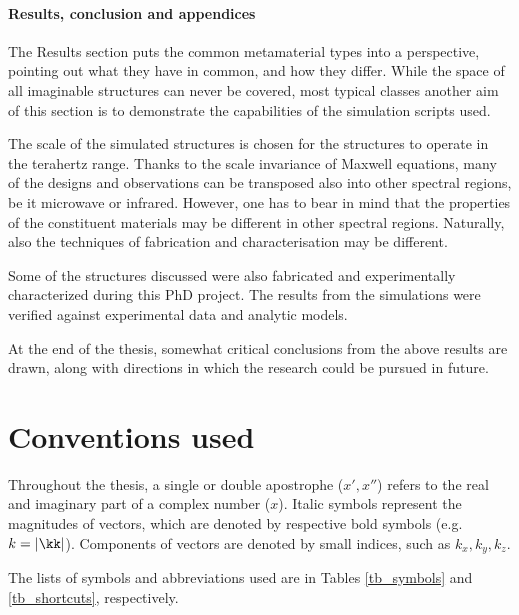\paragraph{Results, conclusion and appendices} %
The Results section puts the common metamaterial types into a perspective, pointing out what they have in common, and how they differ.  %
While the space of all imaginable structures can never be covered, most typical classes  another aim of this section is to demonstrate the capabilities of the simulation scripts used. 

The scale of the simulated structures is chosen for the structures to operate in the terahertz range. 
Thanks to the scale invariance of Maxwell equations, many of the designs and observations can be transposed also into other spectral regions, be it microwave or infrared. However, one has to bear in mind that the properties of the constituent materials may be different in other spectral regions. Naturally, also the techniques of fabrication and characterisation may be different.

Some of the structures discussed were also fabricated and experimentally characterized during this PhD project. 
The results from the simulations were verified against experimental data and analytic models.

At the end of the thesis, somewhat critical conclusions from the above results are drawn, along with directions in which the research could be pursued in future.


\section{Conventions used}%
Throughout the thesis, a single or double apostrophe ($x', x''$) refers to the real and imaginary part of a complex number ($x$). Italic symbols represent the magnitudes of vectors, which are denoted by respective bold symbols (e.g. $k = |\kk|$). Components of vectors are denoted by small indices, such as $k_x, k_y, k_z$. 

The lists of symbols and abbreviations used are in Tables \ref{tb_symbols} and \ref{tb_shortcuts}, respectively. 

